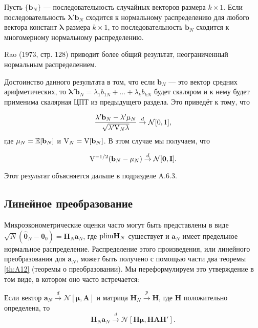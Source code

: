 \begin{theorem}
Пусть $\{\mathbf{b}_N\}$ --- последовательность случайных векторов размера $k\times 1$. Если последовательность $\mathbf{\lambda}'\mathbf{b}_N$ сходится к нормальному распределению для любого вектора констант $\mathbf{\lambda}$ размера $k\times 1$, то последовательность $\mathbf{b}_N$ сходится к многомерному нормальному распределению.
\end{theorem}

Rao (1973, стр. 128) приводит более общий результат, неограниченный нормальным распределением.

Достоинство данного результата в том, что если $\mathbf{b}_N$ --- это вектор средних арифметических, то $\mathbf{\lambda}'\mathbf{b}_N=\lambda_1 b_{1N}+\ldots + \lambda_k b_{kN}$ будет скаляром и к нему будет применима скалярная ЦПТ из предыдущего раздела. Это приведёт к тому, что

\[
\frac{\mathbf{\lambda}'\mathbf{b}_N-\mathbf{\lambda}'\mathbf{\mu}_N}
{\sqrt{\mathbf{\lambda}'\mathbf{\mathrm{V}}_N \mathbf{\lambda}}} \overset{d}{\to} \mathcal{N}[0,1],
\]
где $\mathbf{\mu}_N=\mathbb{E}[\mathbf{b}_N]$ и $\mathbf{\mathrm{V}}_N=\mathrm{V}[\mathbf{b}_N]$. В этом случае мы получаем, что

\begin{equation}
\label{eq:A14}
\mathbf{\mathrm{V}}^{-1/2}(\mathbf{b}_N-\mathbf{\mu}_N)\overset{d}{\to}
\mathcal{N}[\mathbf{0},\mathbf{I}].	
\end{equation}

Этот результат объясняется дальше в подразделе A.6.3.

\subsection{Линейное преобразование}

Микроэконометрические оценки часто могут быть представлены в виде $\sqrt{N}(\hat{\mathbf{\theta}}_N-\mathbf{\theta}_0)=\mathbf{H}_N\mathbf{a}_N$, где $\mathrm{plim } \mathbf{H}_N$ существует и $\mathbf{a}_N$ имеет предельное нормальное распределение. Распределение этого произведения, или линейного преобразования для $\mathbf{a}_N$, может быть получено с помощью части два теоремы \ref{th:A12} (теоремы о преобразовании). Мы переформулируем это утверждение в том виде, в котором оно часто встречается:

\begin{theorem}
\label{th:A17}
Если вектор $\mathbf{a}_N \overset{d}{\to} \mathcal{N}[\mathbf{\mu},\mathbf{A}]$ и матрица $\mathbf{H}_N\overset{p}{\to} \mathbf{H}$, где $\mathbf{H}$ положительно определена, то
\begin{equation}
\label{eq:A15}
\mathbf{H}_N\mathbf{a}_N \overset{d}{\to} \mathcal{N}
[\mathbf{H}\mathbf{\mu},\mathbf{H}\mathbf{A}\mathbf{H}'].
\end{equation}
\end{theorem}

